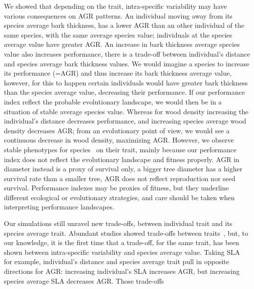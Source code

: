 We showed that depending on the trait, intra-specific variability may have various consequences on AGR patterns. An individual moving away from its species average bark thickness, has a lower AGR than an other individual of the same species, with the same average species value; individuals at the species average value have greater AGR. An increase in bark thickness average species value also increases performance, there is a trade-off between individual's distance and species average bark thickness values. We would imagine a species to increase its performance (=AGR) and thus increase its bark thickness average value, however, for this to happen certain individuals would have greater bark thickness than the species average value, decreasing their performance. If our performance index reflect the probable evolutionary landscape, we would then be in a situation of stable average species value. Whereas for wood density increasing the individual's distance decreases performance, and increasing species average wood density decreases AGR; from an evolutionary point of view, we would see a continuous decrease in wood density, maximizing AGR. However, we observe stable phenotypes for species~\cite{NEEDED} on their trait, mainly because our performance index does not reflect the evolutionary landscape and fitness properly. AGR in diameter instead is a proxy of survival only, a bigger tree diameter has a higher survival rate than a smaller tree, AGR does not reflect reproduction nor seed survival. Performance indexes may be proxies of fitness, but they underline different ecological or evolutionary strategies, and care should be taken when interpreting performance landscapes.

Our simulations still unravel new trade-offs, between individual trait and its species average trait. Abundant studies showed trade-offs between traits~\cite{NEEDED}, but, to our knowledge, it is the first time that a trade-off, for the same trait, has been shown between intra-specific variability and species average value. Taking SLA for example, individual's distance and species average trait pull in opposite directions for AGR: increasing individual's SLA increases AGR, but increasing species average SLA decreases AGR. Those trade-offs 
